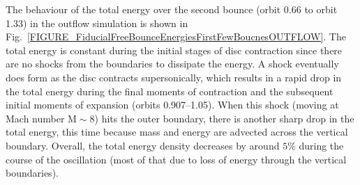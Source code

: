 \documentclass[fleqn,usenatbib]{mnras}
\begin{document}
The behaviour of the total energy over the second bounce (orbit 0.66 to orbit 1.33) in the outflow simulation is shown in Fig.~\ref{FIGURE_FiducialFreeBounceEnergiesFirstFewBoucnesOUTFLOW}. The total energy is constant during the initial stages of disc contraction since there are no shocks from the boundaries to dissipate the energy. A shock eventually does form as the disc contracts supersonically, which results in a rapid drop in the total energy during the final moments of contraction and the subsequent initial moments of expansion (orbits 0.907--1.05). When this shock (moving at Mach number $\text{M}\sim8$) hits the outer boundary, there is another sharp drop in the total energy, this time because mass and energy are advected across the vertical boundary. Overall, the total energy density decreases by around $5\%$ during the course of the oscillation (most of that due to loss of energy through the vertical boundaries).
\end{document}
